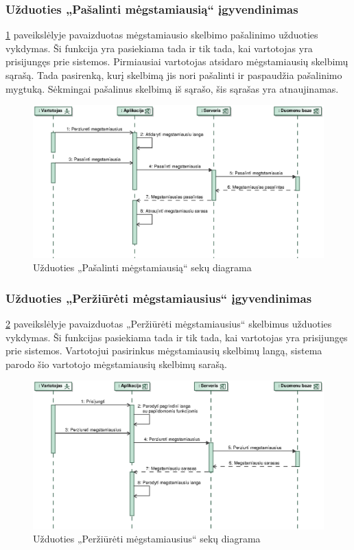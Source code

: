 \documentclass[12pt]{article}
\begin{document}
	\subsubsection{Užduoties „Pašalinti mėgstamiausią“ įgyvendinimas}
	\ref{DelFavSeq} paveikslėlyje pavaizduotas mėgstamiausio skelbimo pašalinimo užduoties vykdymas. Ši funkcija yra pasiekiama tada ir tik tada, kai vartotojas yra prisijungęs prie sistemos. Pirmiausiai vartotojas atsidaro mėgstamiausių skelbimų sąrašą. Tada pasirenką, kurį skelbimą jis nori pašalinti ir paspaudžia pašalinimo mygtuką. Sėkmingai pašalinus skelbimą iš sąrašo, šis sąrašas yra atnaujinamas.
	\begin{figure}[h]
		\begin{center}
			\includegraphics[width=\textwidth]{PasalintiMegstamiausia.eps}
			\caption{Užduoties „Pašalinti mėgstamiausią“ sekų diagrama\label{DelFavSeq}}
		\end{center}
	\end{figure}
	
	\pagebreak
	
	\subsubsection{Užduoties „Peržiūrėti mėgstamiausius“ įgyvendinimas}
	\ref{ViewFavSeq} paveikslėlyje pavaizduotas „Peržiūrėti mėgstamiausius“ skelbimus užduoties vykdymas. Ši funkcijas pasiekiama tada ir tik tada, kai vartotojas yra prisijungęs prie sistemos. Vartotojui pasirinkus mėgstamiausių skelbimų langą, sistema parodo šio vartotojo mėgstamiausių skelbimų sarašą.
	\begin{figure}[h]
		\begin{center}
			\includegraphics[width=\textwidth]{PerziuretiMegstamiausius.eps}
			\caption{Užduoties „Peržiūrėti mėgstamiausius“ sekų diagrama\label{ViewFavSeq}}
		\end{center}
	\end{figure}
	
\end{document}
